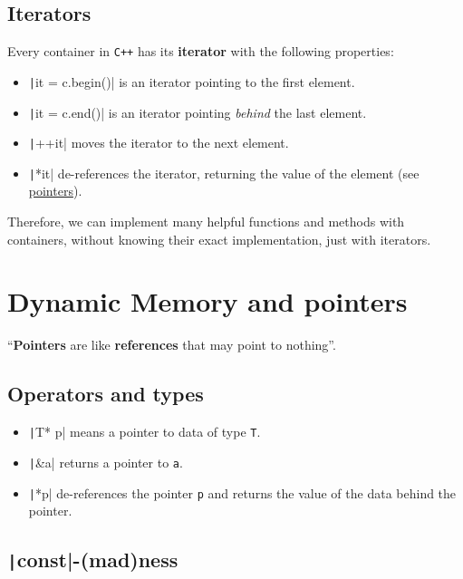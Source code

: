 \documentclass[fontsize=9pt, paper=landscape]{scrartcl}
\begin{document}
\begin{multicols}{2}
\subsection{Iterators}

Every container in \texttt{C++} has its \textbf{iterator} with the following properties:

\begin{itemize}
	\item \texttt|it = c.begin()| is an iterator pointing to the first element.
	\item \texttt|it = c.end()| is an iterator pointing \textit{behind} the last element.
	\item \texttt|++it| moves the iterator to the next element.
	\item \texttt|*it| de-references the iterator, returning the value of the element (see \hyperref[sec:ptrs-op]{pointers}).
\end{itemize}

Therefore, we can implement many helpful functions and methods with containers, without knowing their exact implementation, just with iterators.

\section{Dynamic Memory and pointers}

``\textbf{Pointers} are like \textbf{references} that may point to nothing''.

\subsection{Operators and types}
\label{sec:ptrs-op}

\begin{itemize}
	\item \texttt|T* p| means a pointer to data of type \texttt{T}.
	\item \texttt|&a| returns a pointer to \texttt{a}.
	\item \texttt|*p| de-references the pointer \texttt{p} and returns the value of the data behind the pointer.
\end{itemize}

\subsection{\texttt|const|-(mad)ness}


\end{multicols}
\end{document}
